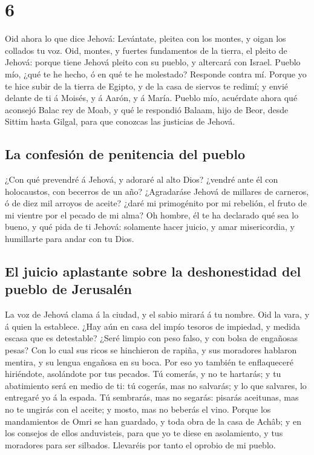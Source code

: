 \hypertarget{section-5}{%
\section{6}\label{section-5}}

 Oid ahora lo que dice Jehová: Levántate, pleitea con los
montes, y oigan los collados tu voz.  Oid, montes, y fuertes
fundamentos de la tierra, el pleito de Jehová: porque tiene Jehová
pleito con su pueblo, y altercará con Israel.  Pueblo mío,
¿qué te he hecho, ó en qué te he molestado? Responde contra mí.
 Porque yo te hice subir de la tierra de Egipto, y de la
casa de siervos te redimí; y envié delante de ti á Moisés, y á Aarón, y
á María.  Pueblo mío, acuérdate ahora qué aconsejó Balac rey
de Moab, y qué le respondió Balaam, hijo de Beor, desde Sittim hasta
Gilgal, para que conozcas las justicias de Jehová.

\hypertarget{la-confesiuxf3n-de-penitencia-del-pueblo}{%
\subsection{La confesión de penitencia del
pueblo}\label{la-confesiuxf3n-de-penitencia-del-pueblo}}

 ¿Con qué prevendré á Jehová, y adoraré al alto Dios?
¿vendré ante él con holocaustos, con becerros de un año? 
¿Agradaráse Jehová de millares de carneros, ó de diez mil arroyos de
aceite? ¿daré mi primogénito por mi rebelión, el fruto de mi vientre por
el pecado de mi alma?  Oh hombre, él te ha declarado qué sea
lo bueno, y qué pida de ti Jehová: solamente hacer juicio, y amar
misericordia, y humillarte para andar con tu Dios.

\hypertarget{el-juicio-aplastante-sobre-la-deshonestidad-del-pueblo-de-jerusaluxe9n}{%
\subsection{El juicio aplastante sobre la deshonestidad del pueblo de
Jerusalén}\label{el-juicio-aplastante-sobre-la-deshonestidad-del-pueblo-de-jerusaluxe9n}}

 La voz de Jehová clama á la ciudad, y el sabio mirará á tu
nombre. Oid la vara, y á quien la establece.  ¿Hay aún en
casa del impío tesoros de impiedad, y medida escasa que es detestable?
 ¿Seré limpio con peso falso, y con bolsa de engañosas
pesas?  Con lo cual sus ricos se hinchieron de rapiña, y
sus moradores hablaron mentira, y su lengua engañosa en su boca.
 Por eso yo también te enflaqueceré hiriéndote, asolándote
por tus pecados.  Tú comerás, y no te hartarás; y tu
abatimiento será en medio de ti: tú cogerás, mas no salvarás; y lo que
salvares, lo entregaré yo á la espada.  Tú sembrarás, mas
no segarás: pisarás aceitunas, mas no te ungirás con el aceite; y mosto,
mas no beberás el vino.  Porque los mandamientos de Omri se
han guardado, y toda obra de la casa de Achâb; y en los consejos de
ellos anduvisteis, para que yo te diese en asolamiento, y tus moradores
para ser silbados. Llevaréis por tanto el oprobio de mi pueblo.

